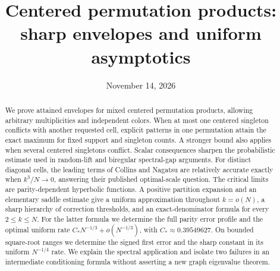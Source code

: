 \documentclass[11pt]{article}
\title{Centered permutation products:\\ sharp envelopes and uniform asymptotics}
\author{}
\date{November 14, 2026}
\theoremstyle{definition}
\theoremstyle{remark}
\newcommand{\1}{\mathbf 1}
\begin{document}
\maketitle
\begin{abstract}
We prove attained envelopes for mixed centered permutation products, allowing arbitrary multiplicities and independent colors. When at most one centered singleton conflicts with another requested cell, explicit patterns in one permutation attain the exact maximum for fixed support and singleton counts. A stronger bound also applies when several centered singletons conflict. Scalar consequences sharpen the probabilistic estimate used in random-lift and biregular spectral-gap arguments. For distinct diagonal cells, the leading terms of Collins and Nagatsu are relatively accurate exactly when $k^3/N\to0$, answering their published optimal-scale question. The critical limits are parity-dependent hyperbolic functions. A positive partition expansion and an elementary saddle estimate give a uniform approximation throughout $k=o(N)$, a sharp hierarchy of correction thresholds, and an exact-denominator formula for every $2\le k\le N$. For the latter formula we determine the full parity error profile and the optimal uniform rate $C_*N^{-1/3}+o(N^{-1/3})$, with $C_*\approx0.39549627$. On bounded square-root ranges we determine the signed first error and the sharp constant in its uniform $N^{-1/4}$ rate. We explain the spectral application and isolate two failures in an intermediate conditioning formula without asserting a new graph eigenvalue theorem.
\end{abstract}
\tableofcontents
\clearpage










\appendix


\end{document}
